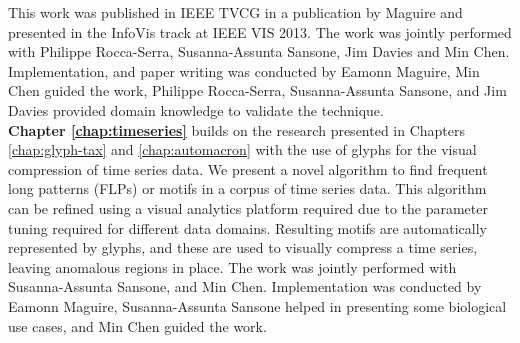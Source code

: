 This work was published in IEEE TVCG in a publication by Maguire \etal \cite{maguire13} and presented in the InfoVis track at IEEE VIS 2013.
The work was jointly performed with Philippe Rocca-Serra, Susanna-Assunta Sansone, Jim Davies and Min Chen.  
Implementation, and paper writing was conducted by Eamonn Maguire, Min Chen guided the work, Philippe Rocca-Serra, Susanna-Assunta Sansone, and Jim Davies provided domain knowledge to validate the technique.\\

\textbf{Chapter \ref{chap:timeseries}} builds on the research presented in Chapters \ref{chap:glyph-tax} and \ref{chap:automacron} with the use of glyphs for the visual compression of time series data.
We present a novel algorithm to find frequent long patterns (FLPs) or motifs in a corpus of time series data. 
This algorithm can be refined using a visual analytics platform required due to the parameter tuning required for different data domains.
Resulting motifs are automatically represented by glyphs, and these are used to visually compress a time series, leaving anomalous regions in place.
The work was jointly performed with Susanna-Assunta Sansone, and Min Chen.
Implementation was conducted by Eamonn Maguire, Susanna-Assunta Sansone helped in presenting some biological use cases, and Min Chen guided the work.\\

